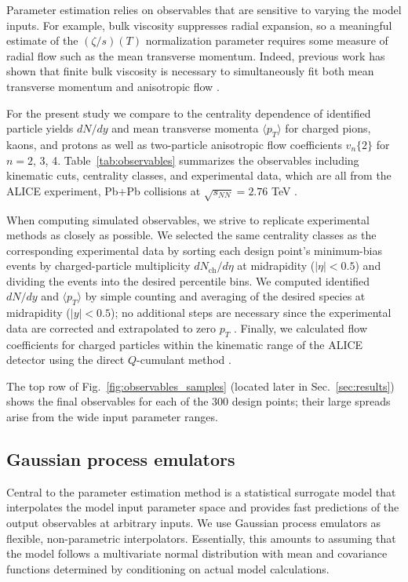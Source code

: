 \documentclass[aps,prc,reprint,amsmath,nofootinbib]{revtex4-1}
\newcommand{\avg}[1]{\langle #1 \rangle}
\newcommand{\nch}{N_\text{ch}}
\newcommand{\sqrts}{\sqrt{s_{NN}}}
\newcommand{\vnk}[2]{v_#1\{#2\}}
\begin{document}
Parameter estimation relies on observables that are sensitive to varying the model inputs.
For example, bulk viscosity suppresses radial expansion, so a meaningful estimate of the $(\zeta/s)(T)$ normalization parameter requires some measure of radial flow such as the mean transverse momentum.
Indeed, previous work has shown that finite bulk viscosity is necessary to simultaneously fit both mean transverse momentum and anisotropic flow \cite{Ryu:2015vwa}.

For the present study we compare to the centrality dependence of identified particle yields $dN/dy$ and mean transverse momenta $\avg{p_T}$ for charged pions, kaons, and protons as well as two-particle anisotropic flow coefficients $\vnk n 2$ for $n = 2$, 3, 4.
Table~\ref{tab:observables} summarizes the observables including kinematic cuts, centrality classes, and experimental data, which are all from the ALICE experiment, Pb+Pb collisions at $\sqrts = 2.76$ TeV \cite{Abelev:2013vea,ALICE:2011ab}.

When computing simulated observables, we strive to replicate experimental methods as closely as possible.
We selected the same centrality classes as the corresponding experimental data by sorting each design point's minimum-bias events by charged-particle multiplicity $d\nch/d\eta$ at midrapidity ($|\eta| < 0.5$) and dividing the events into the desired percentile bins.
We computed identified $dN/dy$ and $\avg{p_T}$ by simple counting and averaging of the desired species at midrapidity ($|y| < 0.5$); no additional steps are necessary since the experimental data are corrected and extrapolated to zero $p_T$ \cite{Abelev:2013vea}.
Finally, we calculated flow coefficients for charged particles within the kinematic range of the ALICE detector using the direct $Q$-cumulant method \cite{Bilandzic:2010jr}.

The top row of Fig.~\ref{fig:observables_samples} (located later in Sec.~\ref{sec:results}) shows the final observables for each of the 300 design points;
their large spreads arise from the wide input parameter ranges.

\subsection{Gaussian process emulators}

\newcommand{\x}{\mathbf x}
\newcommand{\y}{\mathbf y}
\newcommand{\N}{\mathcal N}
\newcommand{\muvec}{\boldsymbol\mu}
\newcommand{\tran}{^\intercal}

Central to the parameter estimation method is a statistical surrogate model that interpolates the model input parameter space and provides fast predictions of the output observables at arbitrary inputs.
We use Gaussian process emulators \cite{Rasmussen:2006gp} as flexible, non-parametric interpolators.
Essentially, this amounts to assuming that the model follows a multivariate normal distribution with mean and covariance functions determined by conditioning on actual model calculations.
\end{document}
